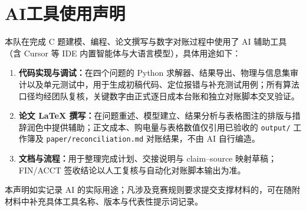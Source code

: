 \section*{AI工具使用声明}

本队在完成 C 题建模、编程、论文撰写与数字对账过程中使用了 AI 辅助工具（含 Cursor 等 IDE 内置智能体与大语言模型），具体用途如下：

\begin{enumerate}[label=\arabic*.,leftmargin=2.2em,itemsep=0.2em]
\item \textbf{代码实现与调试：}在四个问题的 Python 求解器、结果导出、物理与信息集审计以及单元测试中，用于生成初稿代码、定位报错与补充测试用例；所有算法口径均经团队复核，关键数字由正式逐日成本台账和独立对账脚本交叉验证。
\item \textbf{论文 LaTeX 撰写：}在问题重述、模型建立、结果分析与表格图注的排版与措辞润色中提供辅助；正文成本、购电量与表格数值仅引用已验收的 \texttt{output/} 工作簿及 \texttt{paper/reconciliation.md} 对账结果，不由 AI 自行编造。
\item \textbf{文档与流程：}用于整理完成计划、交接说明与 claim--source 映射草稿；FIN/ACCT 签收结论以人工复核与自动化对账脚本输出为准。
\end{enumerate}

本声明如实记录 AI 的实际用途；凡涉及竞赛规则要求提交支撑材料的，可在随附材料中补充具体工具名称、版本与代表性提示词记录。
